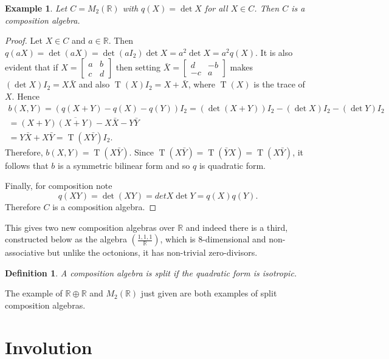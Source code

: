 \documentclass[12pt]{article}
\DeclareMathOperator{\tr}{T}
\newtheorem{defn}[thm]{Definition}
\newtheorem{ex}[thm]{Example}
\newcommand{\CayDick}[2]{\left(\frac{#1}{#2}\right)}
\begin{document}
\begin{ex}
Let $C=M_2(\mathbb{R})$ with $q(X)=\det X$ for all $X\in C$.
Then $C$ is a composition algebra.
\end{ex}
\begin{proof}
Let $X\in C$ and $a\in \mathbb{R}$.  Then $q(aX)=\det (aX)=\det (aI_2)\det X=a^2\det X=a^2 q(X)$.
It is also evident that if $X=\begin{bmatrix} a & b\\ c & d\end{bmatrix}$ then
setting $\bar{X}=\begin{bmatrix} d & -b\\ -c & a\end{bmatrix}$ makes $(\det X)I_2=X\bar{X}$
and also $\tr(X)I_2=X+\bar{X}$, where $\tr(X)$ is the trace of $X$.  Hence
\begin{multline*}
b(X,Y)=(q(X+Y)-q(X)-q(Y))I_2=(\det (X+Y))I_2-(\det X) I_2-(\det Y) I_2\\
  =(X+Y)\overline{(X+Y)} - X \bar{X} - Y\bar{Y}\\
  =Y\bar{X}+X\bar{Y}
  =\tr (X\bar{Y})I_2.
\end{multline*}
Therefore, $b(X,Y)=\tr (X\bar{Y})$.  Since $\tr (X\bar{Y})=\tr (\bar{Y}X)=\tr(X\bar{Y})$, it follows
that $b$ is a symmetric bilinear form and so $q$ is quadratic form.

Finally, for composition note
\begin{equation*}
q(XY)
    = \det(XY)
    = det X\det Y
    = q(X)q(Y).
\end{equation*}
Therefore $C$ is a composition algebra.
\end{proof}

This gives two new composition algebras over $\mathbb{R}$ and indeed there is a third, constructed
below as the algebra $\CayDick{1,1,1}{\mathbb{R}}$, which is 8-dimensional and non-associative but
unlike the octonions, it has non-trivial zero-divisors.

\begin{defn}
A composition algebra is \emph{split} if the quadratic form is isotropic.
\end{defn}

The example of $\mathbb{R}\oplus\mathbb{R}$ and $M_2(\mathbb{R})$ just given are both examples of
split composition algebras.

\section{Involution}
\end{document}
